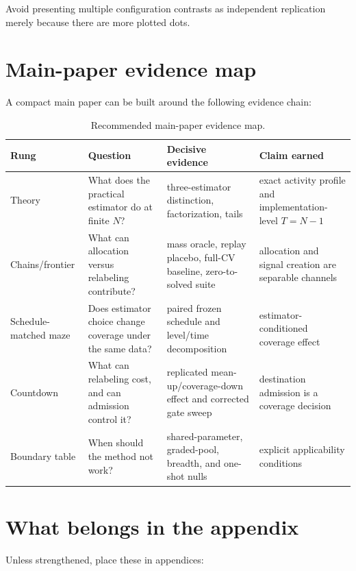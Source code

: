 \documentclass[11pt]{article}
\theoremstyle{definition}
\theoremstyle{remark}
\begin{document}
Avoid presenting multiple configuration contrasts as independent replication merely because there are more plotted dots.

\section{Main-paper evidence map}

A compact main paper can be built around the following evidence chain:

\begin{table}[H]
\centering
\small
\caption{Recommended main-paper evidence map.}
\begin{tabularx}{\textwidth}{@{}p{}p{}p{}X@{}}
\toprule
\textbf{Rung} & \textbf{Question} & \textbf{Decisive evidence} & \textbf{Claim earned}\\
\midrule
Theory & What does the practical estimator do at finite $N$? & three-estimator distinction, factorization, tails & exact activity profile and implementation-level $T=N-1$\\
Chains/frontier & What can allocation versus relabeling contribute? & mass oracle, replay placebo, full-CV baseline, zero-to-solved suite & allocation and signal creation are separable channels\\
Schedule-matched maze & Does estimator choice change coverage under the same data? & paired frozen schedule and level/time decomposition & estimator-conditioned coverage effect\\
Countdown & What can relabeling cost, and can admission control it? & replicated mean-up/coverage-down effect and corrected gate sweep & destination admission is a coverage decision\\
Boundary table & When should the method not work? & shared-parameter, graded-pool, breadth, and one-shot nulls & explicit applicability conditions\\
\bottomrule
\end{tabularx}
\end{table}

\section{What belongs in the appendix}

Unless strengthened, place these in appendices:
\end{document}
